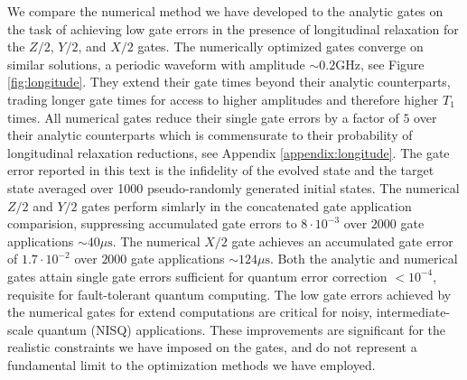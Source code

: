 We compare the numerical method we have developed to the analytic gates
on the task of achieving low gate errors in the presence of longitudinal relaxation
for the $Z/2$, $Y/2$, and $X/2$ gates.
The numerically optimized gates converge on similar solutions, a periodic
waveform with amplitude $\sim 0.2 \textrm{GHz}$, see Figure \ref{fig:longitude}.
They extend their gate times
beyond their analytic counterparts, trading longer gate times for access
to higher amplitudes and therefore higher $T_{1}$ times. All numerical gates reduce
their single gate errors by a factor of $5$ over
their analytic counterparts which is commensurate to their
probability of longitudinal relaxation reductions, see Appendix \ref{appendix:longitude}.
The gate error reported in this text is the infidelity
of the evolved state and the target state averaged over 1000 pseudo-randomly
generated initial states. The numerical $Z/2$ and $Y/2$ gates perform simlarly in
the concatenated gate application comparision, suppressing accumulated gate errors to $8 \cdot 10^{-3}$
over $2000$ gate applications $\sim 40 \mu\textrm{s}$. The numerical $X/2$ gate
achieves an accumulated gate error of $1.7 \cdot 10^{-2}$ over $2000$ gate applications $\sim 124 \mu\textrm{s}$.
Both the analytic and numerical gates attain single gate errors sufficient for
quantum error correction $< 10^{-4}$, requisite for fault-tolerant quantum computing.
The low gate errors achieved by the numerical gates for extend computations
are critical for noisy, intermediate-scale quantum (NISQ) applications.
These improvements are significant for the realistic constraints we have imposed
on the gates, and do not represent a fundamental limit to the optimization methods we have
employed.

